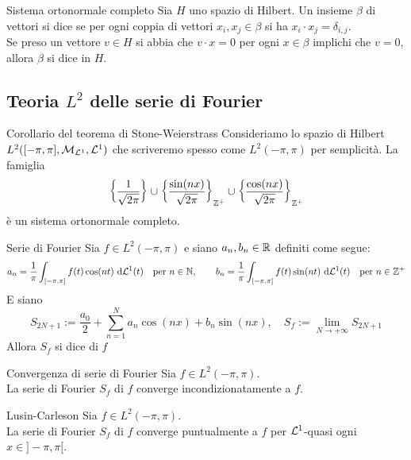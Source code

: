 \documentclass{article}
\begin{document}
\begin{definition}{Sistema ortonormale completo}{}
    Sia $H$ uno spazio di Hilbert. Un insieme $\beta$ di vettori si dice  se per ogni coppia di vettori $x_i, x_j \in \beta$ si ha $x_i \cdot x_j = \delta_{i,j}$.\\
    Se preso un vettore $v \in H$ si abbia  che $v\cdot x = 0$ per ogni $x \in \beta$ implichi che $v=0$, allora $\beta$ si dice  in $H$.
\end{definition}

\subsection{Teoria $L^2$ delle serie di Fourier}

\begin{theorem}{Corollario del teorema di Stone-Weierstrass}{}
    Consideriamo lo spazio di Hilbert $L^2([-\pi,\pi], \mathcal{M}_{\mathcal{L}^1}, \mathcal{L}^1)$ che scriveremo spesso come $L^2(-\pi,\pi)$ per semplicità. La famiglia 
    \[ \left\{ \frac{1}{\sqrt{2\pi}}\right\} \cup \left\{ \frac{\sin(nx)}{\sqrt{2\pi}} \right\}_{\mathbb{Z}^+} \cup \left\{ \frac{\cos(nx)}{\sqrt{2\pi}} \right\}_{\mathbb{Z}^+} \]
    è un sistema ortonormale completo.
\end{theorem}

\begin{definition}{Serie di Fourier}{}
    Sia $f \in L^2(-\pi,\pi)$ e siano $a_n, b_n\in \mathbb{R}$ definiti come segue:
    \[a_n = \frac{1}{\pi} \int_{[-\pi,\pi]} f(t) \cos(nt) \text{ d} \mathcal{L}^1(t) \quad \text{per } n \in \mathbb{N}, \quad \quad b_n = \frac{1}{\pi} \int_{[-\pi,\pi]} f(t) \sin(nt) \text{ d} \mathcal{L}^1(t) \quad \text{per } n \in \mathbb{Z}^+ \]   
    E siano
    \[S_{2N+1} := \frac{a_0}{2} + \sum_{n=1}^{N} a_n \cos(nx) + b_n\sin(nx), \quad S_f:=\lim_{N \to +\infty} S_{2N+1}\]
    Allora $S_f$ si dice  di $f$ 
\end{definition}

\begin{theorem}{Convergenza di serie di Fourier}{}
    Sia $f \in L^2(-\pi,\pi)$.\\ La serie di Fourier $S_f$ di $f$ converge incondizionatamente a $f$.
\end{theorem}

\begin{theorem}{Lusin-Carleson}{}
    Sia $f \in L^2(-\pi,\pi)$.\\
    La serie di Fourier $S_f$ di $f$ converge puntualmente a $f$ per $\mathcal{L}^1$-quasi ogni $x \in ]-\pi,\pi[$.
\end{theorem}
\end{document}
